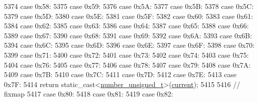 \begin{DoxyCode}
5374             \textcolor{keywordflow}{case} 0x58:
5375             \textcolor{keywordflow}{case} 0x59:
5376             \textcolor{keywordflow}{case} 0x5A:
5377             \textcolor{keywordflow}{case} 0x5B:
5378             \textcolor{keywordflow}{case} 0x5C:
5379             \textcolor{keywordflow}{case} 0x5D:
5380             \textcolor{keywordflow}{case} 0x5E:
5381             \textcolor{keywordflow}{case} 0x5F:
5382             \textcolor{keywordflow}{case} 0x60:
5383             \textcolor{keywordflow}{case} 0x61:
5384             \textcolor{keywordflow}{case} 0x62:
5385             \textcolor{keywordflow}{case} 0x63:
5386             \textcolor{keywordflow}{case} 0x64:
5387             \textcolor{keywordflow}{case} 0x65:
5388             \textcolor{keywordflow}{case} 0x66:
5389             \textcolor{keywordflow}{case} 0x67:
5390             \textcolor{keywordflow}{case} 0x68:
5391             \textcolor{keywordflow}{case} 0x69:
5392             \textcolor{keywordflow}{case} 0x6A:
5393             \textcolor{keywordflow}{case} 0x6B:
5394             \textcolor{keywordflow}{case} 0x6C:
5395             \textcolor{keywordflow}{case} 0x6D:
5396             \textcolor{keywordflow}{case} 0x6E:
5397             \textcolor{keywordflow}{case} 0x6F:
5398             \textcolor{keywordflow}{case} 0x70:
5399             \textcolor{keywordflow}{case} 0x71:
5400             \textcolor{keywordflow}{case} 0x72:
5401             \textcolor{keywordflow}{case} 0x73:
5402             \textcolor{keywordflow}{case} 0x74:
5403             \textcolor{keywordflow}{case} 0x75:
5404             \textcolor{keywordflow}{case} 0x76:
5405             \textcolor{keywordflow}{case} 0x77:
5406             \textcolor{keywordflow}{case} 0x78:
5407             \textcolor{keywordflow}{case} 0x79:
5408             \textcolor{keywordflow}{case} 0x7A:
5409             \textcolor{keywordflow}{case} 0x7B:
5410             \textcolor{keywordflow}{case} 0x7C:
5411             \textcolor{keywordflow}{case} 0x7D:
5412             \textcolor{keywordflow}{case} 0x7E:
5413             \textcolor{keywordflow}{case} 0x7F:
5414                 \textcolor{keywordflow}{return} \textcolor{keyword}{static\_cast<}\hyperlink{classnlohmann_1_1detail_1_1binary__reader_a6e87a28ccbfdb4afcc2c93df9f9dbe74}{number\_unsigned\_t}\textcolor{keyword}{>}(\hyperlink{classnlohmann_1_1detail_1_1binary__reader_a7e994e201b215cd6d6ae28a1853f43e0}{current});
5415 
5416             \textcolor{comment}{// fixmap}
5417             \textcolor{keywordflow}{case} 0x80:
5418             \textcolor{keywordflow}{case} 0x81:
5419             \textcolor{keywordflow}{case} 0x82:

\end{DoxyCode}

